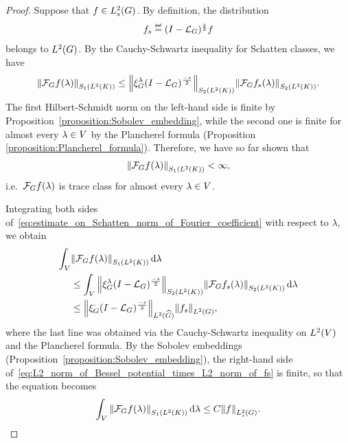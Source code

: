 \begin{proof}
    Suppose that $f \in \Sobolev s$.
    By definition, the distribution
    \begin{align*}
        f_s \defeq \BesselPotential s f
    \end{align*}
    belongs to $\Lebesgue 2 \Group$.
    By the Cauchy-Schwartz inequality for Schatten classes,
    we have
    \begin{align}
        \norm [\SchattenClasses 1 {\Lebesgue 2 \CompactGroup}] {\Fourier f(\lambda)}
        \leq
        \norm [\SchattenClasses 2 {\Lebesgue 2 \CompactGroup}] {\Rep \lambda \BesselPotential {-s}}
        \norm [\SchattenClasses 2 {\Lebesgue 2 \CompactGroup}] {\Fourier f_s(\lambda)}.
        \label{eq:estimate_on_Schatten_norm_of_Fourier_coefficient}
    \end{align}
    The first Hilbert-Schmidt norm on the left-hand side is finite by Proposition~\ref{proposition:Sobolev_embedding},
    while the second one is finite for almost every $\lambda \in \VectorSpace$ by the Plancherel formula (Proposition \ref{proposition:Plancherel_formula}).
    Therefore, we have so far shown that
    \begin{align*}
        \norm [\SchattenClasses 1 {\Lebesgue 2 \CompactGroup}] {\Fourier f(\lambda)}
        < \infty,
    \end{align*}
    i.e.\ $\Fourier f(\lambda)$ is trace class for almost every $\lambda \in \VectorSpace$.

    Integrating both sides of~\eqref{eq:estimate_on_Schatten_norm_of_Fourier_coefficient} with respect to $\lambda$,
    we obtain
    \begin{align}
        \int_\VectorSpace
            &\norm [\SchattenClasses 1 {\Lebesgue 2 \CompactGroup}] {\Fourier f(\lambda)}
        \dd \lambda \notag\\
        &\leq
        \int_\VectorSpace
            \norm [\SchattenClasses 2 {\Lebesgue 2 \CompactGroup}] {\Rep \lambda \BesselPotential {-s}}
            \norm [\SchattenClasses 2 {\Lebesgue 2 \CompactGroup}] {\Fourier f_s(\lambda)}
        \dd \lambda \notag\\
        &\leq
        \norm [\LebesgueDual 2 \Group] {\Rep \dummy \BesselPotential {-s}}
        \norm [\Lebesgue 2 \Group] {f_s},
        \label{eq:L2_norm_of_Bessel_potential_times_L2_norm_of_fs}
    \end{align}
    where the last line was obtained via the Cauchy-Schwartz inequality on $\Lebesgue 2 \VectorSpace$
    and the Plancherel formula.
    By the Sobolev embeddings (Proposition~\ref{proposition:Sobolev_embedding}),
    the right-hand side of~\eqref{eq:L2_norm_of_Bessel_potential_times_L2_norm_of_fs} is finite,
    so that the equation becomes
    \begin{align}
        \int_\VectorSpace
            \norm [\SchattenClasses 1 {\Lebesgue 2 \CompactGroup}] {\Fourier f(\lambda)}
        \dd \lambda
        \leq C \norm [\Sobolev s] {f}.
        \label{eq:Sobolev_inclusion_into_fields_with_integrable_S1_norm}
    \end{align}


\end{proof}
